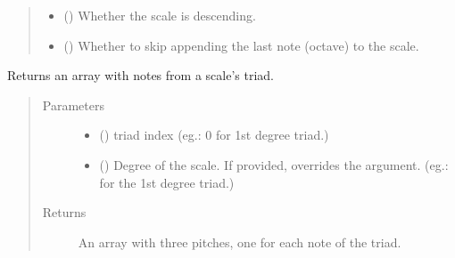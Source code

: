 \documentclass[letterpaper,10pt,english]{sphinxmanual}
\begin{document}
\begin{fulllineitems}
\begin{fulllineitems}
\begin{quote}
\begin{description}
\begin{itemize}
\item {} 
 () \textendash{} Whether the scale is descending.

\item {} 
 () \textendash{} Whether to skip appending the last
note (octave) to the scale.

\end{itemize}

\end{description}\end{quote}

\end{fulllineitems}


\begin{fulllineitems}
\label{\detokenize{birdears:birdears.scale.DiatonicScale.get_triad}}
Returns an array with notes from a scale’s triad.
\begin{quote}\begin{description}
\item[{Parameters}] \leavevmode\begin{itemize}
\item {} 
 () \textendash{} triad index (eg.: 0 for 1st degree triad.)

\item {} 
 () \textendash{} Degree of the scale. If provided, overrides the
 argument. (eg.:  for the 1st degree triad.)

\end{itemize}

\item[{Returns}] \leavevmode
An array with three pitches, one for each note of the triad.

\end{description}\end{quote}

\end{fulllineitems}


\end{fulllineitems}

\end{document}
